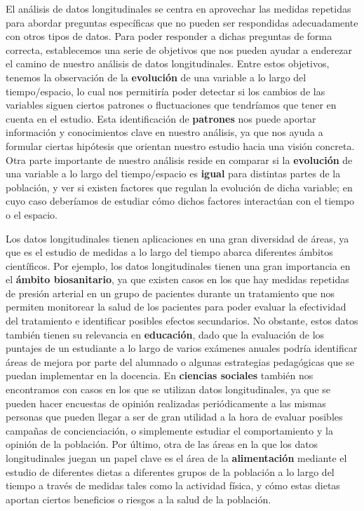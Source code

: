 \documentclass[
  letterpaper,
  DIV=11,
  numbers=noendperiod]{scrreprt}
\begin{document}
El análisis de datos longitudinales se centra en aprovechar las medidas
repetidas para abordar preguntas específicas que no pueden ser
respondidas adecuadamente con otros tipos de datos. Para poder responder
a dichas preguntas de forma correcta, establecemos una serie de
objetivos que nos pueden ayudar a enderezar el camino de nuestro
análisis de datos longitudinales. Entre estos objetivos, tenemos la
observación de la \textbf{evolución} de una variable a lo largo del
tiempo/espacio, lo cual nos permitiría poder detectar si los cambios de
las variables siguen ciertos patrones o fluctuaciones que tendríamos que
tener en cuenta en el estudio. Esta identificación de \textbf{patrones}
nos puede aportar información y conocimientos clave en nuestro análisis,
ya que nos ayuda a formular ciertas hipótesis que orientan nuestro
estudio hacia una visión concreta. Otra parte importante de nuestro
análisis reside en comparar si la \textbf{evolución} de una variable a
lo largo del tiempo/espacio es \textbf{igual} para distintas partes de
la población, y ver si existen factores que regulan la evolución de
dicha variable; en cuyo caso deberíamos de estudiar cómo dichos factores
interactúan con el tiempo o el espacio.

Los datos longitudinales tienen aplicaciones en una gran diversidad de
áreas, ya que es el estudio de medidas a lo largo del tiempo abarca
diferentes ámbitos científicos. Por ejemplo, los datos longitudinales
tienen una gran importancia en el \textbf{ámbito biosanitario}, ya que
existen casos en los que hay medidas repetidas de presión arterial en un
grupo de pacientes durante un tratamiento que nos permiten monitorear la
salud de los pacientes para poder evaluar la efectividad del tratamiento
e identificar posibles efectos secundarios. No obstante, estos datos
también tienen su relevancia en \textbf{educación}, dado que la
evaluación de los puntajes de un estudiante a lo largo de varios
exámenes anuales podría identificar áreas de mejora por parte del
alumnado o algunas estrategias pedagógicas que se puedan implementar en
la docencia. En \textbf{ciencias sociales} también nos encontramos con
casos en los que se utilizan datos longitudinales, ya que se pueden
hacer encuestas de opinión realizadas periódicamente a las mismas
personas que pueden llegar a ser de gran utilidad a la hora de evaluar
posibles campañas de concienciación, o simplemente estudiar el
comportamiento y la opinión de la población. Por último, otra de las
áreas en la que los datos longitudinales juegan un papel clave es el
área de la \textbf{alimentación} mediante el estudio de diferentes
dietas a diferentes grupos de la población a lo largo del tiempo a
través de medidas tales como la actividad física, y cómo estas dietas
aportan ciertos beneficios o riesgos a la salud de la población.
\end{document}
